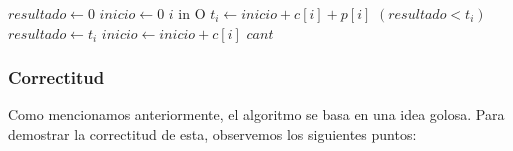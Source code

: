 \begin{algorithm}[H]
\caption{} 
\begin{codebox}
\li $resultado \gets 0$
\li $inicio \gets 0$
\li \For $i$ in O\Do
\li   $t_i \gets inicio + c[i] + p[i]$ 	
\li  	\If $(resultado < t_i)$ \Do
\li 		$resultado \gets t_i$		
 		\End
\li		$inicio \gets inicio  + c[i]$ 		
 	\End	
\li \Return $cant $
\End
\end{codebox}
\end{algorithm}

\subsubsection{Correctitud} 

Como mencionamos anteriormente, el algoritmo se basa en una idea golosa. Para demostrar la correctitud de esta, observemos los siguientes puntos:
 
